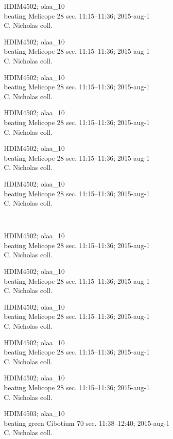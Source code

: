 \documentclass[2pt]{extarticle}
\begin{document}
\noindent
\parbox{0.16\textwidth}{\tiny \raggedright \rule[-0.3\baselineskip]{0pt}{10pt}HDIM4502; olaa\_10\\ beating Melicope 28 sec. 11:15--11:36; 2015-aug-1\\ C. Nicholas coll.}
\parbox{0.16\textwidth}{\tiny \raggedright \rule[-0.3\baselineskip]{0pt}{10pt}HDIM4502; olaa\_10\\ beating Melicope 28 sec. 11:15--11:36; 2015-aug-1\\ C. Nicholas coll.}
\parbox{0.16\textwidth}{\tiny \raggedright \rule[-0.3\baselineskip]{0pt}{10pt}HDIM4502; olaa\_10\\ beating Melicope 28 sec. 11:15--11:36; 2015-aug-1\\ C. Nicholas coll.}
\parbox{0.16\textwidth}{\tiny \raggedright \rule[-0.3\baselineskip]{0pt}{10pt}HDIM4502; olaa\_10\\ beating Melicope 28 sec. 11:15--11:36; 2015-aug-1\\ C. Nicholas coll.}
\parbox{0.16\textwidth}{\tiny \raggedright \rule[-0.3\baselineskip]{0pt}{10pt}HDIM4502; olaa\_10\\ beating Melicope 28 sec. 11:15--11:36; 2015-aug-1\\ C. Nicholas coll.}
\parbox{0.16\textwidth}{\tiny \raggedright \rule[-0.3\baselineskip]{0pt}{10pt}HDIM4502; olaa\_10\\ beating Melicope 28 sec. 11:15--11:36; 2015-aug-1\\ C. Nicholas coll.} \\ 
\vspace{0.001in} 

\noindent
\parbox{0.16\textwidth}{\tiny \raggedright \rule[-0.3\baselineskip]{0pt}{10pt}HDIM4502; olaa\_10\\ beating Melicope 28 sec. 11:15--11:36; 2015-aug-1\\ C. Nicholas coll.}
\parbox{0.16\textwidth}{\tiny \raggedright \rule[-0.3\baselineskip]{0pt}{10pt}HDIM4502; olaa\_10\\ beating Melicope 28 sec. 11:15--11:36; 2015-aug-1\\ C. Nicholas coll.}
\parbox{0.16\textwidth}{\tiny \raggedright \rule[-0.3\baselineskip]{0pt}{10pt}HDIM4502; olaa\_10\\ beating Melicope 28 sec. 11:15--11:36; 2015-aug-1\\ C. Nicholas coll.}
\parbox{0.16\textwidth}{\tiny \raggedright \rule[-0.3\baselineskip]{0pt}{10pt}HDIM4502; olaa\_10\\ beating Melicope 28 sec. 11:15--11:36; 2015-aug-1\\ C. Nicholas coll.}
\parbox{0.16\textwidth}{\tiny \raggedright \rule[-0.3\baselineskip]{0pt}{10pt}HDIM4502; olaa\_10\\ beating Melicope 28 sec. 11:15--11:36; 2015-aug-1\\ C. Nicholas coll.}
\parbox{0.16\textwidth}{\tiny \raggedright \rule[-0.3\baselineskip]{0pt}{10pt}HDIM4503; olaa\_10\\ beating green Cibotium 70 sec. 11:38--12:40; 2015-aug-1\\ C. Nicholas coll.} \\ 
\vspace{0.001in} 
\end{document}
